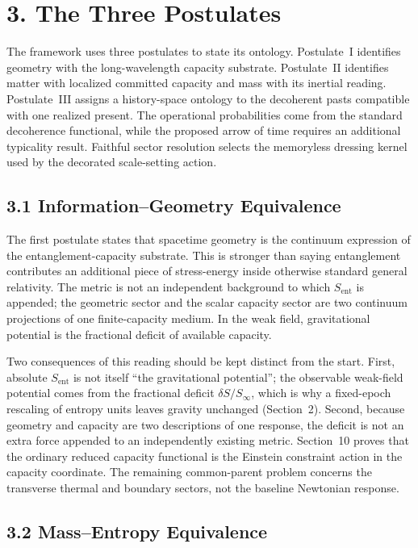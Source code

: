 \documentclass[11pt]{article}
\begin{document}
\section{3. The Three Postulates}

The framework uses three postulates to state its ontology. Postulate~I identifies geometry with the long-wavelength capacity substrate. Postulate~II identifies matter with localized committed capacity and mass with its inertial reading. Postulate~III assigns a history-space ontology to the decoherent pasts compatible with one realized present. The operational probabilities come from the standard decoherence functional, while the proposed arrow of time requires an additional typicality result. Faithful sector resolution selects the memoryless dressing kernel used by the decorated scale-setting action.

\subsection{3.1 Information--Geometry Equivalence}

The first postulate states that spacetime geometry is the continuum expression of the entanglement-capacity substrate. This is stronger than saying entanglement contributes an additional piece of stress-energy inside otherwise standard general relativity. The metric is not an independent background to which $S_{\mathrm{ent}}$ is appended; the geometric sector and the scalar capacity sector are two continuum projections of one finite-capacity medium. In the weak field, gravitational potential is the fractional deficit of available capacity.

Two consequences of this reading should be kept distinct from the start. First, absolute $S_{\mathrm{ent}}$ is not itself ``the gravitational potential''; the observable weak-field potential comes from the fractional deficit $\delta S/S_\infty$, which is why a fixed-epoch rescaling of entropy units leaves gravity unchanged (Section~2). Second, because geometry and capacity are two descriptions of one response, the deficit is not an extra force appended to an independently existing metric. Section~10 proves that the ordinary reduced capacity functional is the Einstein constraint action in the capacity coordinate. The remaining common-parent problem concerns the transverse thermal and boundary sectors, not the baseline Newtonian response.

\subsection{3.2 Mass--Entropy Equivalence}
\end{document}
